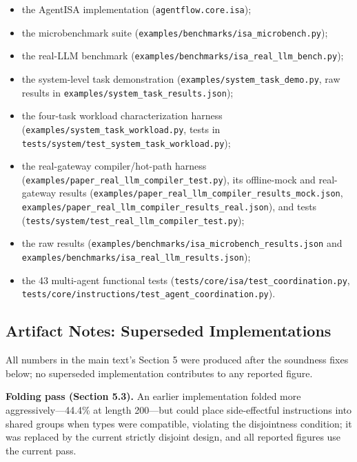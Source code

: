 \documentclass[
  11pt,
]{article}
\providecommand{\tightlist}{%
  \setlength{\itemsep}{0pt}\setlength{\parskip}{0pt}}
\begin{document}
\begin{itemize}
\tightlist
\item
  the AgentISA implementation (\texttt{agentflow.core.isa});
\item
  the microbenchmark suite
  (\texttt{examples/benchmarks/isa\_microbench.py});
\item
  the real-LLM benchmark
  (\texttt{examples/benchmarks/isa\_real\_llm\_bench.py});
\item
  the system-level task demonstration
  (\texttt{examples/system\_task\_demo.py}, raw results in
  \texttt{examples/system\_task\_results.json});
\item
  the four-task workload characterization harness
  (\texttt{examples/system\_task\_workload.py}, tests in
  \texttt{tests/system/test\_system\_task\_workload.py});
\item
  the real-gateway compiler/hot-path harness
  (\texttt{examples/paper\_real\_llm\_compiler\_test.py}), its
  offline-mock and real-gateway results
  (\texttt{examples/paper\_real\_llm\_compiler\_results\_mock.json},
  \texttt{examples/paper\_real\_llm\_compiler\_results\_real.json}), and
  tests (\texttt{tests/system/test\_real\_llm\_compiler\_test.py});
\item
  the raw results
  (\texttt{examples/benchmarks/isa\_microbench\_results.json} and
  \texttt{examples/benchmarks/isa\_real\_llm\_results.json});
\item
  the 43 multi-agent functional tests
  (\texttt{tests/core/isa/test\_coordination.py},
  \texttt{tests/core/instructions/test\_agent\_coordination.py}).
\end{itemize}

\subsection{Artifact Notes: Superseded
Implementations}\label{artifact-notes-superseded-implementations}

All numbers in the main text's Section 5 were produced after the
soundness fixes below; no superseded implementation contributes to any
reported figure.

\textbf{Folding pass (Section 5.3).} An earlier implementation folded
more aggressively---44.4\% at length 200---but could place
side-effectful instructions into shared groups when types were
compatible, violating the disjointness condition; it was replaced by the
current strictly disjoint design, and all reported figures use the
current pass.
\end{document}

